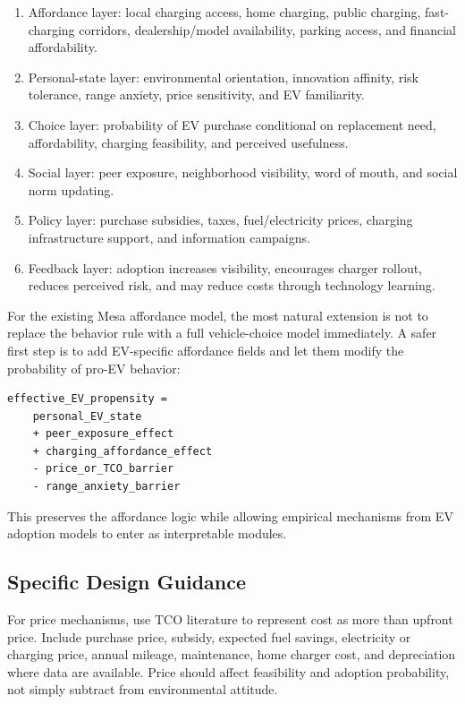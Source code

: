 \documentclass[11pt]{article} %
\begin{document}
\begin{enumerate}
    \item Affordance layer: local charging access, home charging, public
    charging, fast-charging corridors, dealership/model availability, parking
    access, and financial affordability.
    \item Personal-state layer: environmental orientation, innovation affinity,
    risk tolerance, range anxiety, price sensitivity, and EV familiarity.
    \item Choice layer: probability of EV purchase conditional on replacement
    need, affordability, charging feasibility, and perceived usefulness.
    \item Social layer: peer exposure, neighborhood visibility, word of mouth,
    and social norm updating.
    \item Policy layer: purchase subsidies, taxes, fuel/electricity prices,
    charging infrastructure support, and information campaigns.
    \item Feedback layer: adoption increases visibility, encourages charger
    rollout, reduces perceived risk, and may reduce costs through technology
    learning.
\end{enumerate}

For the existing Mesa affordance model, the most natural extension is not to
replace the behavior rule with a full vehicle-choice model immediately. A safer
first step is to add EV-specific affordance fields and let them modify the
probability of pro-EV behavior:

\begin{verbatim}
effective_EV_propensity =
    personal_EV_state
    + peer_exposure_effect
    + charging_affordance_effect
    - price_or_TCO_barrier
    - range_anxiety_barrier
\end{verbatim}

This preserves the affordance logic while allowing empirical mechanisms from EV
adoption models to enter as interpretable modules.

\subsection{Specific Design Guidance}

For price mechanisms, use TCO literature to represent cost as more than upfront
price. Include purchase price, subsidy, expected fuel savings, electricity or
charging price, annual mileage, maintenance, home charger cost, and depreciation
where data are available. Price should affect feasibility and adoption
probability, not simply subtract from environmental attitude.
\end{document}
